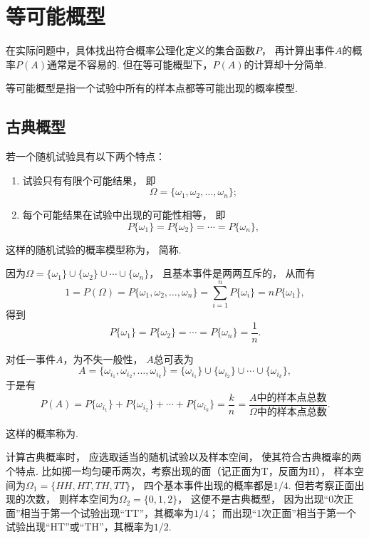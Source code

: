\section{等可能概型}
在实际问题中，具体找出符合概率公理化定义的集合函数\(P\)，
再计算出事件\(A\)的概率\(P(A)\)通常是不容易的.
但在等可能概型下，\(P(A)\)的计算却十分简单.

等可能概型是指一个试验中所有的样本点都等可能出现的概率模型.
\subsection{古典概型}
\begin{definition}
若一个随机试验具有以下两个特点：
\begin{enumerate}
	\item 试验只有有限个可能结果，
	即\[
		\Omega = \{\omega_1, \omega_2, \dotsc, \omega_n\};
	\]

	\item 每个可能结果在试验中出现的可能性相等，
	即\[
		P\{\omega_1\} = P\{\omega_2\} = \dotsb = P\{\omega_n\},
	\]
\end{enumerate}
这样的随机试验的概率模型称为，
简称.
\end{definition}

因为\(\Omega = \{\omega_1\}\cup\{\omega_2\}\cup\dotsb\cup\{\omega_n\}\)，
且基本事件是两两互斥的，
从而有\[
	1 = P(\Omega) = P\{\omega_1, \omega_2, \dotsc, \omega_n\}
	= \sum_{i=1}^n P\{\omega_i\}
	= n P\{\omega_1\},
\]
得到\[
	P\{\omega_1\} = P\{\omega_2\} = \dotsb = P\{\omega_n\} = \frac{1}{n}.
\]

对任一事件\(A\)，为不失一般性，
\(A\)总可表为\[
	A = \{\omega_{i_1},\omega_{i_2},\dotsc,\omega_{i_k}\}
	= \{\omega_{i_1}\}\cup\{\omega_{i_2}\}\cup\dotsb\cup\{\omega_{i_k}\},
\]
于是有\[
	P(A) = P\{\omega_{i_1}\} + P\{\omega_{i_2}\} + \dotsb + P\{\omega_{i_k}\}
	= \frac{k}{n} = \frac{A \text{中的样本点总数}}{\Omega \text{中的样本点总数}}.
\]

这样的概率称为.

计算古典概率时，
应选取适当的随机试验以及样本空间，
使其符合古典概率的两个特点.
比如掷一均匀硬币两次，考察出现的面（记正面为T，反面为H），
样本空间为\(\Omega_1 = \{ HH, HT, TH, TT \}\)，
四个基本事件出现的概率都是\(1/4\).
但若考察正面出现的次数，
则样本空间为\(\Omega_2 = \{ 0,1,2 \}\)，
这便不是古典概型，
因为出现“0次正面”相当于第一个试验出现“TT”，其概率为\(1/4\)；
而出现“1次正面”相当于第一个试验出现“HT”或“TH”，其概率为\(1/2\).

